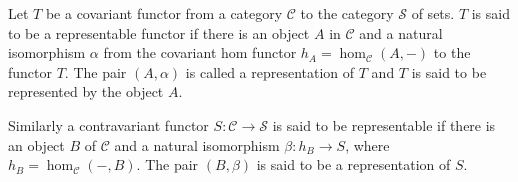 Let $T$ be a covariant functor from a category $\mathcal{C}$ to the category $\mathcal{S}$ of sets. $T$ is said to be a representable functor if there is an object $A$ in $\mathcal{C}$ and a natural isomorphism $\alpha$ from the covariant hom functor $h_A = \hom_{\mathcal{C}}(A, -)$ to the functor $T$. The pair $(A, \alpha)$ is called a representation of $T$ and $T$ is said to be represented by the object $A$.

Similarly a contravariant functor $S : \mathcal{C} \to \mathcal{S}$ is said to be representable if there is an object $B$ of $\mathcal{C}$ and a natural isomorphism $\beta : h_B \to S$, where $h_B = \hom_{\mathcal{C}}(-, B)$. The pair $(B, \beta)$ is said to be a representation of $S$.
